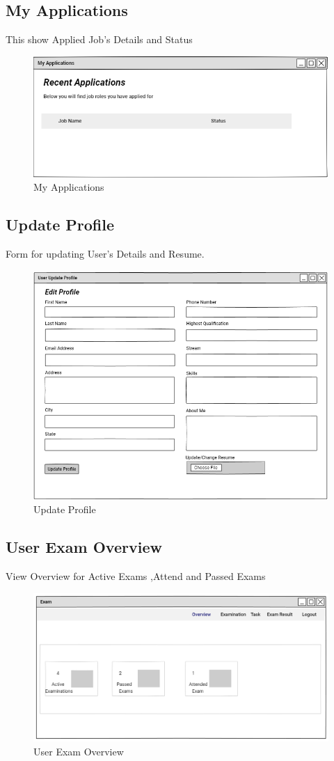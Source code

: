 \documentclass[a4paper,12pt]{report}
\begin{document}
\subsection {My Applications}
This show Applied Job's Details and Status
\begin{figure}[bph]
	\centering
	\includegraphics[width=.7\linewidth]{img/user/useraplictns}
	\caption{My Applications}
\end{figure}

\subsection {Update Profile}
Form for updating User's Details and Resume.
\begin{figure}[bph]
	\centering
	\includegraphics[width=.7\linewidth ]{img/user/userupdate}
	\caption{Update Profile}
\end{figure}

\subsection {User Exam Overview}
View Overview for Active Exams ,Attend and Passed Exams
\begin{figure}[bph]
	\centering
	\includegraphics[width=.4\linewidth]{img/user/userexamoverview}
		\caption{User Exam Overview}
\end{figure}
\end{document}
